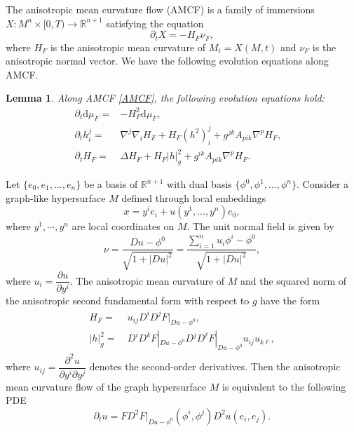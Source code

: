 \documentclass[11pt,reqno]{amsart}
\newtheorem{lemma}[proposition]{Lemma}
\theoremstyle{definition}
\theoremstyle{remark}
\numberwithin{equation}{section}
\begin{document}
The anisotropic mean curvature flow (AMCF) is a family of immersions $X:M^n\times[0,T)\to\mathbb{R}^{n+1}$ satisfying the equation
	\begin{equation}
		\label{AMCF}
		\partial_t X = -H_F\nu_F,
	\end{equation}
	where $H_F$ is the anisotropic mean curvature of $M_t=X(M,t)$ and $\nu_F$ is the anisotropic normal vector.  We have the following evolution equations along AMCF. 
	
	\begin{lemma}
		Along AMCF \eqref{AMCF}, the following evolution equations hold:
		\begin{align}
            \partial_t \mathrm{d}\mu_F =& - H_F^2 \mathrm{d}\mu_F, &\label{equ-amcfarea}\\
			\partial_t h^j_i =& \nabla^j\nabla_i H_F + H_F (h^2)^j_i +  g^{jk}A_{pik}\nabla^p H_F, \label{equ-aniwei}\\
			\partial_t H_F =& \Delta H_F + H_F |h|_{g}^2 +  g^{ik}A_{pik}\nabla^p H_F. \label{equ-amceq}
		\end{align}
	\end{lemma}

	
	Let $\{e_{0},e_{1},...,e_{n}\}$ be a basis of $\mathbb{R}^{n+1}$ with dual basis $\{\phi^{0},\phi^{1},...,\phi^{n}\}$. Consider a graph-like hypersurface $M$ defined through local embeddings
	\begin{equation*}
		x=y^{i}e_{i}+u(y^{1},...,y^{n})e_{0},
	\end{equation*}
	where $y^1,\cdots,y^n$ are local coordinates on $M$. The unit normal field is given by
	\begin{equation*}
		\nu = \dfrac{Du - \phi^0}{\sqrt{1+|Du|^2}} = \dfrac{\sum_{i=1}^{n}u_{i}\phi^{i}-\phi^0}{\sqrt{1+|Du|^2}},
	\end{equation*}
	where $u_i=\dfrac{\partial u}{\partial y^i}$. The anisotropic mean curvature of $M$ and the squared norm of the anisotropic second fundamental form with respect to $g$ have the form 
	\begin{align*}
		H_F = &~u_{ij}D^iD^j F|_{Du-\phi^0},\\ 
        |h|_{g}^2 = & ~D^iD^kF|_{Du-\phi^0}D^jD^{\ell}F|_{Du-\phi^0} u_{ij}u_{k\ell},
	\end{align*}
    where $u_{ij}=\dfrac{\partial^2 u}{\partial y^i \partial y^j}$ denotes the second-order derivatives. Then the anisotropic mean curvature flow of the graph hypersurface $M$ is equivalent to the following PDE
	\begin{equation*}
		\partial_tu=FD^2F|_{Du-\phi^0}(\phi^i,\phi^j)D^2u(e_i,e_j).
	\end{equation*}
	
\end{document}
